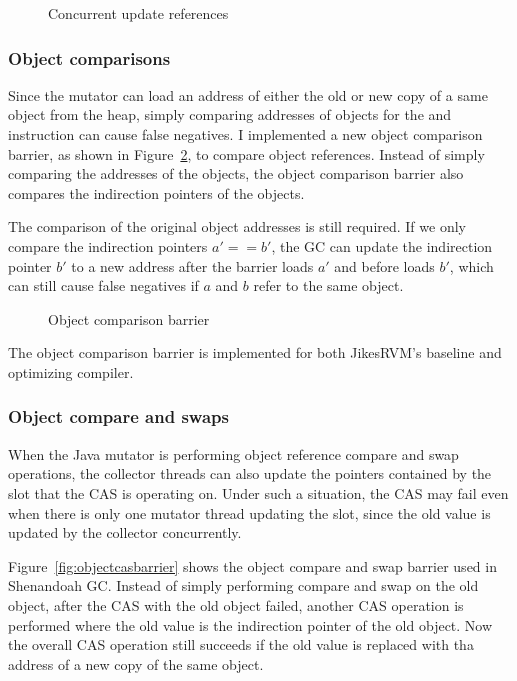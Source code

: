 \begin{figure}
  \centering
  
  \caption{Concurrent update references}
  \label{fig:concupdaterefs}
\end{figure}

\subsubsection{Object comparisons}

Since the mutator can load an address of either the old or new copy of a same object
from the heap, simply comparing addresses of objects for the  and 
instruction can cause false negatives. I implemented a new object comparison barrier,
as shown in Figure~\ref{fig:objectcomparisonbarrier}, to compare object references.
Instead of simply comparing the addresses of the objects, the object comparison barrier also
compares the indirection pointers of the objects.

The comparison of the original object addresses is still required. If we only compare the
indirection pointers $a' == b'$, the GC can update the indirection pointer $b'$ to a new
address after the barrier loads $a'$ and before loads $b'$, which can still cause false
negatives if $a$ and $b$ refer to the same object.

\begin{figure}
  \centering
  
  \caption{Object comparison barrier}
  \label{fig:objectcomparisonbarrier}
\end{figure}

The object comparison barrier is implemented for both JikesRVM's baseline and optimizing compiler.

\subsubsection{Object compare and swaps}

When the Java mutator is performing object reference compare and swap operations,
the collector threads can also update the pointers contained by the slot that the CAS
is operating on. Under such a situation, the CAS may fail even when there is only one mutator
thread updating the slot, since the old value is updated by the collector concurrently.

Figure~\ref{fig:objectcasbarrier} shows the object compare and swap barrier used in Shenandoah GC.
Instead of simply performing compare and swap on the old object, after the CAS with the old object failed,
another CAS operation is performed where the old value is the indirection pointer of the old object.
Now the overall CAS operation still succeeds if the old value is replaced with
tha address of a new copy of the same object.


